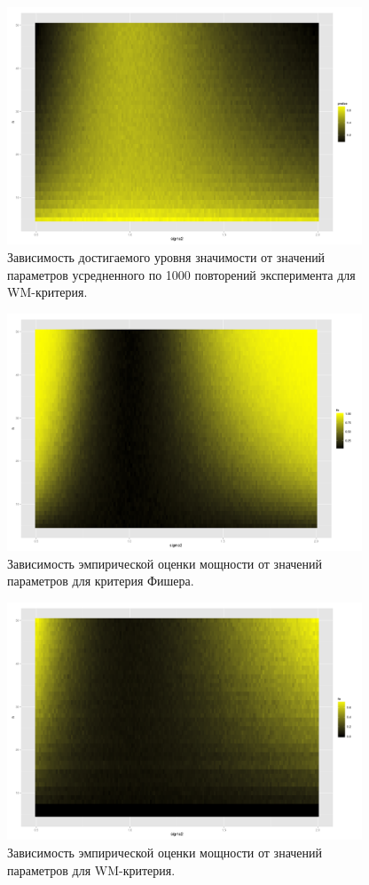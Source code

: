 \documentclass[10pt]{article}
\begin{document}
\begin{figure}[h]
  \centering
  \includegraphics[width=300pt]{wm_pvalue.png}
  \caption{Зависимость достигаемого уровня значимости от значений параметров усредненного по 1000 повторений эксперимента для WM-критерия.}
\end{figure}

\begin{figure}[h]
  \centering
  \includegraphics[width=300pt]{f_fo.png}
  \caption{Зависимость эмпирической оценки мощности от значений параметров для критерия Фишера.}
\end{figure}

\begin{figure}[h]
  \centering
  \includegraphics[width=300pt]{wm_fo.png}
  \caption{Зависимость эмпирической оценки мощности от значений параметров для WM-критерия.}
\end{figure}
\end{document}
